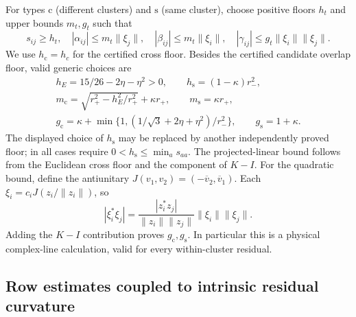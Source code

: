 For types $\mathrm c$ (different clusters) and $\mathrm s$ (same cluster),
choose positive floors $h_t$ and upper bounds $m_t,g_t$ such that
\begin{equation}\label{app:local:type-bounds}
 s_{ij}\ge h_t,\quad |\alpha_{ij}|\le m_t\|\xi_j\|,\quad
 |\beta_{ij}|\le m_t\|\xi_i\|,\quad
 |\gamma_{ij}|\le g_t\|\xi_i\|\|\xi_j\|.
\end{equation}
We use $h_{\mathrm c}=h_c$ for the certified cross floor.
Besides the certified candidate overlap floor, valid generic choices are
\begin{gather}
 h_E=15/26-2\eta-\eta^2>0,\qquad
 h_{\mathrm s}=(1-\kappa)r_-^2,\nonumber\\
 m_{\mathrm c}=\sqrt{r_+^2-h_E^2/r_+^2}+\kappa r_+,\qquad
 m_{\mathrm s}=\kappa r_+,\label{app:local:generic-fiber}\\
 g_{\mathrm c}=\kappa+\min\{1,(1/\sqrt3+2\eta+\eta^2)/r_-^2\},\qquad
 g_{\mathrm s}=1+\kappa.\nonumber
\end{gather}
The displayed choice of $h_{\mathrm s}$ may be replaced by another
independently proved floor; in all cases require
$0<h_{\mathrm s}\le\min_a s_{aa}$.
The projected-linear bound follows from the Euclidean cross floor and
the component of $K-I$. For the quadratic bound, define the antiunitary
$J(v_1,v_2)=(-\overline v_2,\overline v_1)$. Each
$\xi_i=c_iJ(z_i/\|z_i\|)$, so
\[
 |\xi_i^*\xi_j|=
 \frac{|z_i^*z_j|}{\|z_i\|\|z_j\|}\|\xi_i\|\|\xi_j\|.
\]
Adding the $K-I$ contribution proves $g_{\mathrm c},g_{\mathrm s}$.
In particular this is a physical complex-line calculation, valid for
every within-cluster residual.

\subsection{Row estimates coupled to intrinsic residual curvature}
\label{app:local:rows}

